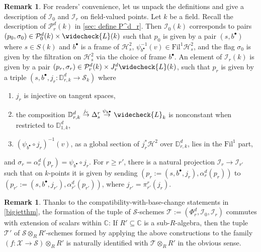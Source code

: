 \documentclass[letter, 11pt]{article}
\theoremstyle{plain}
\theoremstyle{definition}
\newtheorem{remark}[subsubsection]{Remark}
\newcommand{\IC}{\mathbb{C}}
\newcommand{\ID}{\mathbb{D}}
\newcommand{\che}[1]{\widecheck{#1}}
\newcommand\tensor{{\otimes}}
\newcommand{\<}{\langle}
\renewcommand{\>}{\rangle}
\newcommand{\sI}{\mathcal{I}}
\newcommand{\sH}{\mathcal{H}}
\newcommand{\sX}{\mathcal{X}}
\newcommand{\sS}{\mathcal{S}}
\newcommand{\sP}{\mathcal{P}}
\newcommand{\Fil}{\mathrm{Fil}}
\begin{document}
\begin{remark}
    \label{rmk: unpack definition}
    For readers' convenience, let us unpack the definitions and give a description of $\sI_0$ and $\sI_{r}$ on field-valued points. Let $k$ be a field. Recall the description of $\sP^d_r(k)$ in \ref{sec: define P^d_r}. Then $\sI_0(k)$ corresponds to pairs $(p_0, \sigma_0) \in \sP^{d}_{0}(k) \times \che{L} (k)$ such that $p_0$ is given by a pair $(s, b^\bullet)$ where $s \in S(k)$ and $b^\bullet$ is a frame of $\sH^2_s$, $\psi_{b^\bullet}^{-1}(v) \in \Fil^1 \sH^2_s$, and the flag $\sigma_0$ is given by the filtration on $\sH^2_s$ via the choice of frame $b^\bullet$. An element of $\sI_r(k)$ is given by a pair $(p_r, \sigma_r) \in \sP^d_r(k) \times J^d_r \che{L}(k)$, such that $p_r$ is given by a triple $(s, b^\bullet, j_r : \ID^d_{r, k} \to \sS_k)$ where 
\begin{enumerate}[label=\upshape{(\roman*)}]
    \item $j_r$ is injective on tangent spaces, 
    \item the composition $\ID^d_{r, k} \stackrel{j_r}{\to} \Delta^r_s \stackrel{\psi_{b^\bullet}}{\to} \che{L}_k$ is nonconstant when restricted to $\ID^d_{1, k}$, 
    \item $(\psi_{b^\bullet} \circ j_r)^{-1} (v)$, as a global section of $j_r^* \sH^2$ over $\ID^d_{r, k}$, lies in the $\Fil^1$ part, 
\end{enumerate}
and $\sigma_r = \alpha^d_r(p_r) = \psi_{b^\bullet} \circ j_r$. For $r \ge r'$, there is a natural projection $\sI_{r} \to \sI_{r'}$ such that on $k$-points it is given by sending $(p_r := (s, b^\bullet, j_r), \alpha_{r}^d(p_r))$ to $(p_{r'} := (s, b^\bullet, j_{r'}), \alpha^d_{r'}(p_{r'}))$, where $j_{r'} = \pi^r_{r'}(j_r)$. 
\end{remark}



\begin{remark}
\label{rmk: I_r commutes with base change}
    Thanks to the compatibility-with-base-change statements in \ref{bigjetthm}, the formation of the tuple of $\sS$-schemes $\mathcal{T} := (\Phi^d_r, \sI_0, \sI_r)$ commutes with extension of scalars within $\IC$: If $R' \subseteq \IC$ is a sub-$R$-algebra, then the tuple $\mathcal{T}'$ of $\sS \tensor_R R'$-schemes formed by applying the above constructions to the family $(f : \sX \to \sS) \tensor_R R'$ is naturally identified with $\mathcal{T} \tensor_R R'$ in the obvious sense.  
\end{remark}
\end{document}
